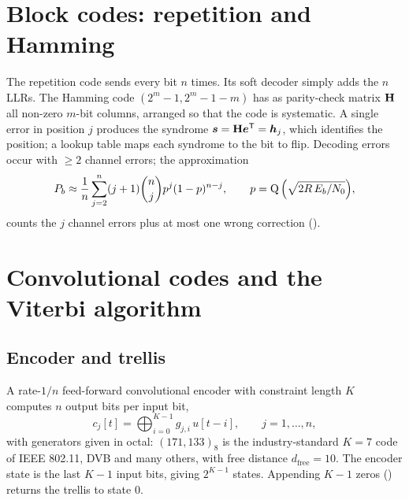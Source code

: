 \section{Block codes: repetition and Hamming}
The repetition code sends every bit $n$ times. Its soft decoder simply adds the $n$ LLRs. The
Hamming code $(2^m-1,2^m-1-m)$ has as parity-check matrix $\mathbf{H}$ all non-zero $m$-bit columns,
arranged so that the code is systematic. A single error in position $j$ produces the syndrome
$\bm{s}=\mathbf{H}\bm{e}^{\mathsf{T}}=\bm{h}_j$, which identifies the position; a lookup table maps each
syndrome to the bit to flip. Decoding errors occur with $\ge2$ channel errors; the approximation
\begin{equation}
  P_b\approx\frac1n\sum_{j=2}^{n}(j+1)\binom nj p^j(1-p)^{n-j},\qquad p=\operatorname{Q}\Big(\sqrt{2R\,E_b/N_0}\Big),
\end{equation}
counts the $j$ channel errors plus at most one wrong correction ().

\section{Convolutional codes and the Viterbi algorithm}\label{sec:conv}
\subsection{Encoder and trellis}
A rate-$1/n$ feed-forward convolutional encoder with constraint length $K$ computes $n$ output
bits per input bit,
\begin{equation}
  c_j[t]=\bigoplus_{i=0}^{K-1}g_{j,i}\,u[t-i],\qquad j=1,\dots,n,
\end{equation}
with generators given in octal: $(171,133)_8$ is the industry-standard $K=7$ code of IEEE
802.11, DVB and many others, with free distance $d_{\mathrm{free}}=10$. The encoder state is
the last $K-1$ input bits, giving $2^{K-1}$ states. Appending $K-1$ zeros ()
returns the trellis to state 0.

